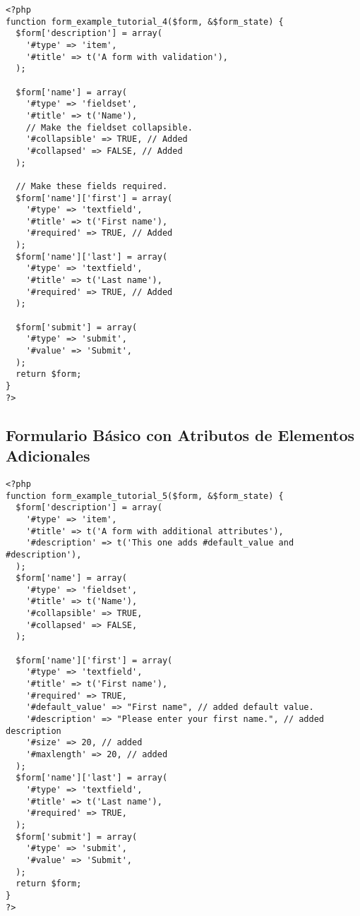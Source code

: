 \documentclass[11pt]{article}
\begin{document}
\begin{verbatim}
<?php
function form_example_tutorial_4($form, &$form_state) {
  $form['description'] = array(
    '#type' => 'item', 
    '#title' => t('A form with validation'),
  );

  $form['name'] = array(
    '#type' => 'fieldset', 
    '#title' => t('Name'),
    // Make the fieldset collapsible. 
    '#collapsible' => TRUE, // Added 
    '#collapsed' => FALSE, // Added
  );

  // Make these fields required.
  $form['name']['first'] = array(
    '#type' => 'textfield', 
    '#title' => t('First name'), 
    '#required' => TRUE, // Added
  );
  $form['name']['last'] = array(
    '#type' => 'textfield', 
    '#title' => t('Last name'), 
    '#required' => TRUE, // Added
  );

  $form['submit'] = array(
    '#type' => 'submit', 
    '#value' => 'Submit',
  );
  return $form;
}
?>
\end{verbatim}



\subsection{Formulario Básico con Atributos de Elementos Adicionales}
\label{sec-4.7}



\begin{verbatim}
<?php
function form_example_tutorial_5($form, &$form_state) {
  $form['description'] = array(
    '#type' => 'item', 
    '#title' => t('A form with additional attributes'), 
    '#description' => t('This one adds #default_value and #description'),
  );
  $form['name'] = array(
    '#type' => 'fieldset', 
    '#title' => t('Name'), 
    '#collapsible' => TRUE, 
    '#collapsed' => FALSE,
  );

  $form['name']['first'] = array(
    '#type' => 'textfield', 
    '#title' => t('First name'), 
    '#required' => TRUE, 
    '#default_value' => "First name", // added default value. 
    '#description' => "Please enter your first name.", // added description 
    '#size' => 20, // added 
    '#maxlength' => 20, // added
  );
  $form['name']['last'] = array(
    '#type' => 'textfield', 
    '#title' => t('Last name'), 
    '#required' => TRUE,
  );
  $form['submit'] = array(
    '#type' => 'submit', 
    '#value' => 'Submit',
  );
  return $form;
}
?>
\end{verbatim}
\end{document}
